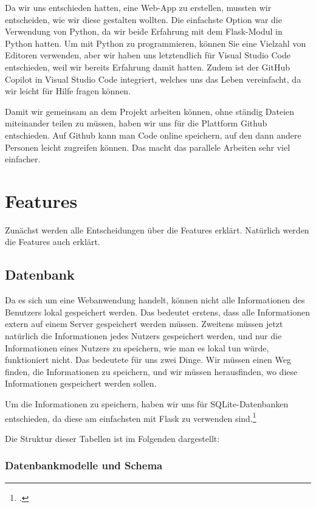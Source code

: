 \documentclass[12pt,a4paper]{report}
\begin{document}
Da wir uns entschieden hatten, eine Web-App zu erstellen, mussten wir entscheiden, wie wir diese gestalten wollten. Die einfachste Option war die Verwendung von Python, da wir beide Erfahrung mit dem Flask-Modul in Python hatten. Um mit Python zu programmieren, können Sie eine Vielzahl von Editoren verwenden, aber wir haben uns letztendlich für Visual Studio Code entschieden, weil wir bereits Erfahrung damit hatten. Zudem ist der GitHub Copilot in Visual Studio Code integriert, welches uns das Leben vereinfacht, da wir leicht für Hilfe fragen können.

Damit wir gemeinsam an dem Projekt arbeiten können, ohne ständig Dateien miteinander teilen zu müssen, haben wir uns für die Plattform Github entschieden. Auf Github kann man Code online speichern, auf den dann andere Personen leicht zugreifen können. Das macht das parallele Arbeiten sehr viel einfacher. 


\section{Features}
Zunächst werden alle Entscheidungen über die Features erklärt. Natürlich werden die Features auch erklärt.

\subsection{Datenbank}
Da es sich um eine Webanwendung handelt, können nicht alle Informationen des Benutzers lokal gespeichert werden. Das bedeutet erstens, dass alle Informationen extern auf einem Server gespeichert werden müssen. Zweitens müssen jetzt natürlich die Informationen jedes Nutzers gespeichert werden, und nur die Informationen eines Nutzers zu speichern, wie man es lokal tun würde, funktioniert nicht. Das bedeutete für uns zwei Dinge. Wir müssen einen Weg finden, die Informationen zu speichern, und wir müssen herausfinden, wo diese Informationen gespeichert werden sollen.

Um die Informationen zu speichern, haben wir uns für SQLite-Datenbanken entschieden, da diese am einfachsten mit Flask zu verwenden sind.\footcite{flask_database_tutorial}

Die Struktur dieser Tabellen ist im Folgenden dargestellt:

\subsubsection{Datenbankmodelle und Schema}
\end{document}
